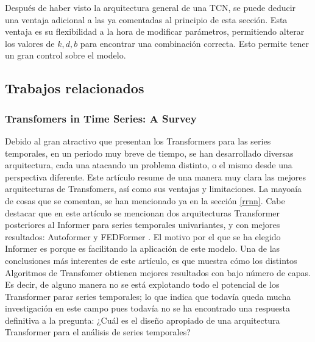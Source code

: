 \addtocounter{footnote}{1}

Después de haber visto la arquitectura general de una TCN, se puede deducir una ventaja adicional a las ya comentadas al principio de esta sección. Esta ventaja es su flexibilidad a la hora de modificar parámetros, permitiendo alterar los valores de $k, d, b$ para encontrar una combinación correcta. Esto permite tener un gran control sobre el modelo.
\subsection{Trabajos relacionados}



\subsubsection{Transfomers in Time Series: A Survey}
Debido al gran atractivo que presentan los Transformers para las series temporales, en un periodo muy breve de tiempo, se han desarrollado diversas arquitectura, cada una atacando un problema distinto, o el mismo desde una perspectiva diferente. Este artículo \parencite{surveyTransfTS} resume de una manera muy clara las mejores arquitecturas de Transfomers, así como sus ventajas y limitaciones. La mayoaía de cosas que se comentan, se han mencionado ya en la sección \ref{rrnn}. Cabe destacar que en este artículo se mencionan dos arquitecturas Transformer posteriores al Informer para series temporales univariantes\fnm, y con mejores resultados: Autoformer \parencite{Autoformer} y FEDFormer \parencite{FEDFormer}.  El motivo por el que se ha elegido Informer es porque es  facilitando la aplicación de este modelo.
Una de las conclusiones más interentes de este artículo, es que muestra cómo los distintos Algoritmos de Transfomer obtienen mejores resultados con bajo número de capas. Es decir, de alguno manera no se está explotando todo el potencial de los Transformer parar series temporales; lo que indica que todavía queda mucha investigación en este campo pues todavía no se ha encontrado una respuesta definitiva a la pregunta: ¿Cuál es el diseño apropiado de una arquitectura Transformer para el análisis de series temporales? 


